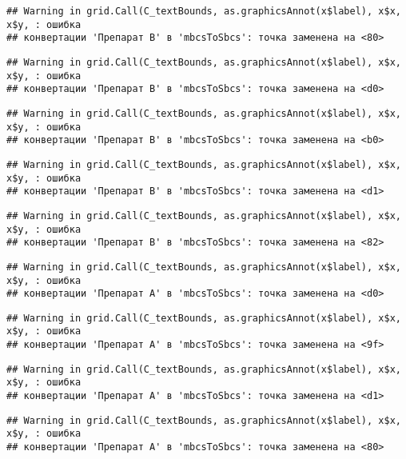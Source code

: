 \documentclass[
]{article}
\begin{document}
\begin{verbatim}
## Warning in grid.Call(C_textBounds, as.graphicsAnnot(x$label), x$x, x$y, : ошибка
## конвертации 'Препарат B' в 'mbcsToSbcs': точка заменена на <80>
\end{verbatim}

\begin{verbatim}
## Warning in grid.Call(C_textBounds, as.graphicsAnnot(x$label), x$x, x$y, : ошибка
## конвертации 'Препарат B' в 'mbcsToSbcs': точка заменена на <d0>
\end{verbatim}

\begin{verbatim}
## Warning in grid.Call(C_textBounds, as.graphicsAnnot(x$label), x$x, x$y, : ошибка
## конвертации 'Препарат B' в 'mbcsToSbcs': точка заменена на <b0>
\end{verbatim}

\begin{verbatim}
## Warning in grid.Call(C_textBounds, as.graphicsAnnot(x$label), x$x, x$y, : ошибка
## конвертации 'Препарат B' в 'mbcsToSbcs': точка заменена на <d1>
\end{verbatim}

\begin{verbatim}
## Warning in grid.Call(C_textBounds, as.graphicsAnnot(x$label), x$x, x$y, : ошибка
## конвертации 'Препарат B' в 'mbcsToSbcs': точка заменена на <82>
\end{verbatim}

\begin{verbatim}
## Warning in grid.Call(C_textBounds, as.graphicsAnnot(x$label), x$x, x$y, : ошибка
## конвертации 'Препарат A' в 'mbcsToSbcs': точка заменена на <d0>
\end{verbatim}

\begin{verbatim}
## Warning in grid.Call(C_textBounds, as.graphicsAnnot(x$label), x$x, x$y, : ошибка
## конвертации 'Препарат A' в 'mbcsToSbcs': точка заменена на <9f>
\end{verbatim}

\begin{verbatim}
## Warning in grid.Call(C_textBounds, as.graphicsAnnot(x$label), x$x, x$y, : ошибка
## конвертации 'Препарат A' в 'mbcsToSbcs': точка заменена на <d1>
\end{verbatim}

\begin{verbatim}
## Warning in grid.Call(C_textBounds, as.graphicsAnnot(x$label), x$x, x$y, : ошибка
## конвертации 'Препарат A' в 'mbcsToSbcs': точка заменена на <80>
\end{verbatim}
\end{document}
